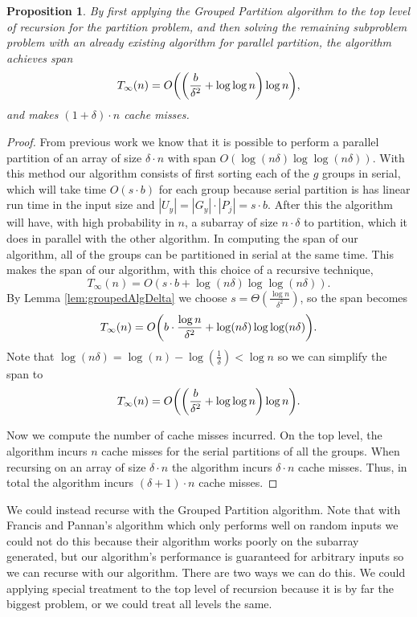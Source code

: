 \documentclass[twocolumn, twoside, 12pt]{article}
\DeclarePairedDelimiter{\paren}{(}{)}
\renewcommand{\paragraph}[1]{\vspace{0.09in}\noindent{\bf \boldmath #1.}}
\newtheorem{proposition}{Proposition}
\begin{document}
\begin{proposition}
By first applying the Grouped Partition algorithm to the top level of recursion for the partition problem, and then solving the remaining subproblem problem with an already existing algorithm for parallel partition, the algorithm achieves span
	$$T_\infty(n) = O\paren*{\paren*{\frac{b}{\delta^2} + \log\log n} \log n},$$ and makes $(1+
\delta)\cdot n$ cache misses.
\end{proposition}
\begin{proof}
From previous work we know that it is possible to perform a parallel partition of an array of size $\delta\cdot n$ with span $O(\log(n\delta)\log\log(n\delta)).$ 
With this method our algorithm consists of first sorting each of the $g$ groups in serial, which will take time $O(s\cdot b)$ for each group because serial partition is has linear run time in the input size and $|U_y|=|G_y|\cdot |P_j| = s \cdot b$. 
After this the algorithm will have, with high probability in $n$, a subarray of size $n \cdot \delta$ to partition, which it does in parallel with the other algorithm. 
In computing the span of our algorithm, all of the groups can be partitioned in serial at the same time. 
This makes the span of our algorithm, with this choice of a recursive technique, 
	$$T_\infty(n) = O(s\cdot b + \log(n\delta)\log\log(n\delta)).$$ 
	By Lemma \ref{lem:groupedAlgDelta} we choose $s = \Theta(\frac{\log n}{\delta^2})$, so the span becomes 
	$$T_\infty(n)=  O\paren*{b \cdot \frac{\log n}{\delta ^2} + \log(n\delta)\log\log(n\delta)}.$$
Note that $\log(n\delta) = \log(n) - \log(\frac{1}{\delta}) < \log n$ so we can simplify the span to
	$$T_\infty(n) = O\paren*{\paren*{\frac{b}{\delta^2} + \log\log n} \log n}.$$

	Now we compute the number of cache misses incurred. 
	On the top level, the algorithm incurs $n$ cache misses for the serial partitions of all the groups.
	When recursing on an array of size $\delta \cdot n$ the algorithm incurs $\delta \cdot n$ cache misses. 
	Thus, in total the algorithm incurs $(\delta + 1) \cdot n$ cache misses.
\end{proof}

\paragraph{Recursing With the Same Algorithm}
We could instead recurse with the Grouped Partition algorithm.
Note that with Francis and Pannan's algorithm which only performs well on random inputs we could not do this because their algorithm works poorly on the subarray generated, but our algorithm's performance is guaranteed for arbitrary inputs so we can recurse with our algorithm.
There are two ways we can do this. 
We could applying special treatment to the top level of recursion because it is by far the biggest problem, or we could treat all levels the same.
\end{document}
